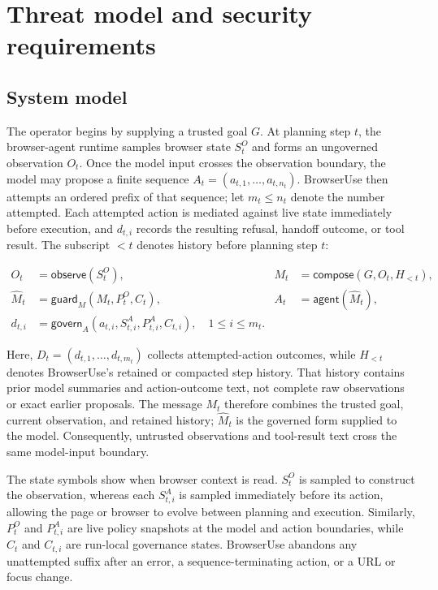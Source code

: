 \chapter{Threat model and security requirements}
\label{chap:threat-model}

\section{System model}

The operator begins by supplying a trusted goal $G$. At planning step $t$, the
browser-agent runtime samples browser state $S_t^O$ and forms an ungoverned
observation $O_t$. Once the model input crosses the observation boundary, the
model may propose a finite sequence
$A_t=(a_{t,1},\ldots,a_{t,n_t})$. BrowserUse then attempts an ordered prefix of
that sequence; let $m_t\leq n_t$ denote the number attempted. Each attempted
action is mediated against live state immediately before execution, and
$d_{t,i}$ records the resulting refusal, handoff outcome, or tool result. The
subscript $<t$ denotes history before planning step $t$:

\[
\begin{aligned}
  O_t &= \mathsf{observe}(S_t^O), &
  M_t &= \mathsf{compose}(G,O_t,H_{<t}), \\
  \widehat{M}_t &= \mathsf{guard}_{M}(M_t,P_t^O,C_t), &
  A_t &= \mathsf{agent}(\widehat{M}_t), \\
  d_{t,i} &=
  \mathsf{govern}_{A}(a_{t,i},S_{t,i}^A,P_{t,i}^A,C_{t,i}),
  \quad 1\leq i\leq m_t.
\end{aligned}
\]

Here, $D_t=(d_{t,1},\ldots,d_{t,m_t})$ collects attempted-action outcomes, while
$H_{<t}$ denotes BrowserUse's retained or compacted step history. That history
contains prior model summaries and action-outcome text, not complete raw
observations or exact earlier proposals. The message $M_t$ therefore combines
the trusted goal, current observation, and retained history; $\widehat{M}_t$ is
the governed form supplied to the model. Consequently, untrusted observations
and tool-result text cross the same model-input boundary.

The state symbols show when browser context is read. $S_t^O$ is sampled to
construct the observation, whereas each $S_{t,i}^A$ is sampled immediately
before its action, allowing the page or browser to evolve between planning and
execution. Similarly, $P_t^O$ and $P_{t,i}^A$ are live policy snapshots at the
model and action boundaries, while $C_t$ and $C_{t,i}$ are run-local governance
states. BrowserUse abandons any unattempted suffix after an error, a
sequence-terminating action, or a URL or focus change.

